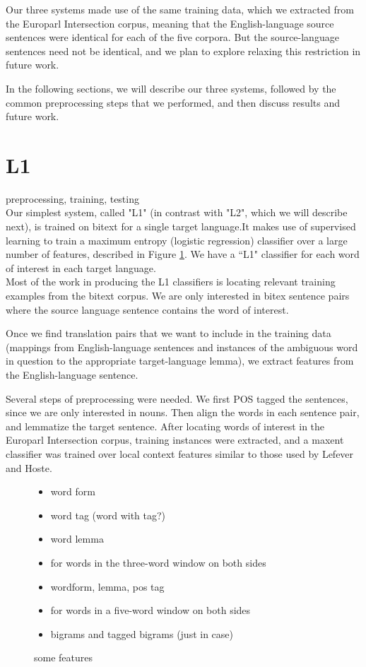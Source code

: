 \documentclass[11pt,letterpaper]{article}
\begin{document}
Our three systems made use of the same training data, which we extracted from
the Europarl Intersection corpus, meaning that the English-language source
sentences were identical for each of the five corpora. But the source-language
sentences need not be identical, and we plan to explore relaxing this
restriction in future work.


In the following sections, we will describe our three systems, followed by the
common preprocessing steps that we performed, and then discuss results and
future work.

\section{L1}
preprocessing, training, testing\\
Our simplest system, called "L1" (in contrast with "L2", which we will describe
next), is trained on bitext for a single target language.It makes use of supervised learning to train a maximum entropy (logistic
regression) classifier over a large number of features, described in Figure
\ref{features}. 
We have a ``L1" classifier for each word of interest in each target language.\\  

Most of the work in producing the L1 classifiers is locating relevant training
examples from the bitext corpus. We are only interested in bitex sentence pairs where the source language sentence contains the word of interest.

Once we find translation pairs that we want to include in the training data
(mappings from English-language sentences and instances of the ambiguous word
in question to the appropriate target-language lemma), we extract features from
the English-language sentence. 

Several steps of preprocessing were needed. We first POS tagged the sentences, since we are only interested in nouns.
Then align the words in each sentence pair, and lemmatize the target sentence.
After locating words of interest in the
Europarl Intersection corpus, training instances were extracted, and a maxent
classifier was trained over local context features similar to those used by Lefever and
Hoste.

\begin{figure}
  \begin{itemize}
  \item word form
  \item word tag (word with tag?)
  \item word lemma
  \item for words in the three-word window on both sides
  \item wordform, lemma, pos tag
  \item for words in a five-word window on both sides
  \item bigrams and tagged bigrams (just in case)
  \end{itemize}
  \label{features}
  \caption{some features}
\end{figure}
\end{document}

